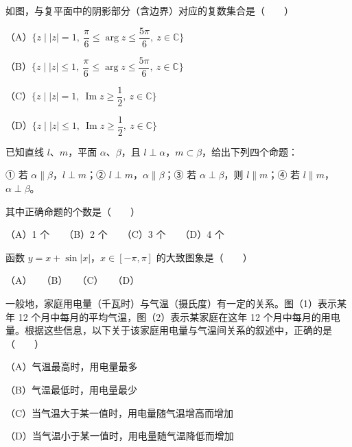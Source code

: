 \Needspace{0.4\textheight}
\begin{question}
如图，与复平面中的阴影部分（含边界）对应的复数集合是\mbox{（　　）}
\nopagebreak[4]
\begin{center}\end{center}
\nopagebreak[4]
（A）$\{z\mid |z|=1,\ \dfrac\pi6\le\arg z\le\dfrac{5\pi}6,\ z\in\mathbb C\}$

（B）$\{z\mid |z|\le1,\ \dfrac\pi6\le\arg z\le\dfrac{5\pi}6,\ z\in\mathbb C\}$

（C）$\{z\mid |z|=1,\ \operatorname{Im}z\ge\dfrac12,\ z\in\mathbb C\}$

（D）$\{z\mid |z|\le1,\ \operatorname{Im}z\ge\dfrac12,\ z\in\mathbb C\}$

\end{question}
\begin{question}
已知直线 $l\text{、}m$，平面 $\alpha\text{、}\beta$，且 $l\perp\alpha$，$m\subset\beta$，给出下列四个命题：

① 若 $\alpha\parallel\beta$，$l\perp m$；② $l\perp m$，$\alpha\parallel\beta$；③ 若 $\alpha\perp\beta$，则 $l\parallel m$；④ 若 $l\parallel m$，$\alpha\perp\beta$。

其中正确命题的个数是\mbox{（　　）}

（A）1 个　　（B）2 个　　（C）3 个　　（D）4 个

\Needspace{0.4\textheight}
\end{question}
\begin{question}
函数 $y=x+\sin|x|$，$x\in[-\pi,\pi]$ 的大致图象是\mbox{（　　）}
\nopagebreak[4]
\begin{center}\end{center}
\nopagebreak[4]
（A）　　（B）　　（C）　　（D）

\Needspace{0.4\textheight}
\end{question}
\begin{question}
一般地，家庭用电量（千瓦时）与气温（摄氏度）有一定的关系。图（1）表示某年 12 个月中每月的平均气温，图（2）表示某家庭在这年 12 个月中每月的用电量。根据这些信息，以下关于该家庭用电量与气温间关系的叙述中，正确的是\mbox{（　　）}
\nopagebreak[4]
\begin{center}\end{center}
\nopagebreak[4]
（A）气温最高时，用电量最多

（B）气温最低时，用电量最少

（C）当气温大于某一值时，用电量随气温增高而增加

（D）当气温小于某一值时，用电量随气温降低而增加

\end{question}

